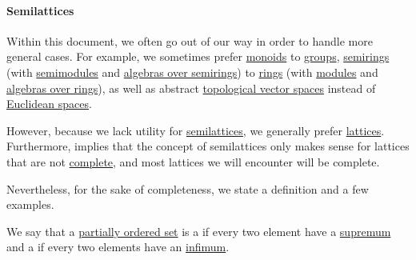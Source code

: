 \paragraph{Semilattices}

\begin{remark}\label{rem:semilattices}
  Within this document, we often go out of our way in order to handle more general cases. For example, we sometimes prefer \hyperref[def:monoid]{monoids} to \hyperref[def:group]{groups}, \hyperref[def:semiring]{semirings} (with \hyperref[def:semimodule]{semimodules} and \hyperref[def:algebra_over_semiring]{algebras over semirings}) to \hyperref[def:ring]{rings} (with \hyperref[def:modules]{modules} and \hyperref[def:algebra_over_ring]{algebras over rings}), as well as abstract \hyperref[def:topological_vector_space]{topological vector spaces} instead of \hyperref[def:euclidean_space]{Euclidean spaces}.

  However, because we lack utility for \hyperref[def:semilattice]{semilattices}, we generally prefer \hyperref[def:lattice]{lattices}. Furthermore,  implies that the concept of semilattices only makes sense for lattices that are not \hyperref[def:complete_lattice]{complete}, and most lattices we will encounter will be complete.

  Nevertheless, for the sake of completeness, we state a definition and a few examples.
\end{remark}

\begin{definition}\label{def:semilattice}
  We say that a \hyperref[def:partially_ordered_set]{partially ordered set} is a  if every two element have a \hyperref[def:extremal_points/supremum_and_infimum]{supremum} and a  if every two elements have an \hyperref[def:extremal_points/supremum_and_infimum]{infimum}.
\end{definition}

